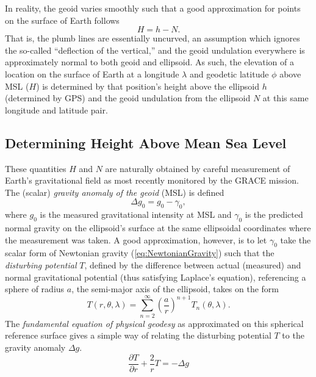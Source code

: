 \documentclass[11pt,dvipsnames]{thesis}
\begin{document}
In reality, the geoid varies smoothly such that a good approximation for points on the surface of Earth follows
\begin{equation}
H = h - N. \label{eq:ElevationAboveMSL}
\end{equation}
That is, the plumb lines are essentially uncurved, an assumption which ignores the so-called ``deflection of the vertical,'' and the geoid undulation everywhere is approximately normal to both geoid and ellipsoid. As such, the elevation of a location on the surface of Earth at a longitude $\lambda$ and geodetic latitude $\phi$ above MSL ($H$) is determined by that position's height above the ellipsoid $h$ (determined by GPS) and the geoid undulation from the ellipsoid $N$ at this same longitude and latitude pair.

\subsection{Determining Height Above Mean Sea Level}
These quantities $H$ and $N$ are naturally obtained by careful measurement of Earth's gravitational field as most recently monitored by the GRACE mission. The (scalar) \textit{gravity anomaly of the geoid} (MSL) is defined
\begin{equation}
\Delta g_0 = g_0 - \gamma_0,
\end{equation}
where $g_0$ is the measured gravitational intensity at MSL and $\gamma_0$ is the predicted normal gravity on the ellipsoid's surface at the same ellipsoidal coordinates where the measurement was taken. A good approximation, however, is to let $\gamma_0$ take the scalar form of Newtonian gravity (\ref{eq:NewtonianGravity}) such that the \textit{disturbing potential} $T$, defined by the difference between actual (measured) and normal gravitational potential (thus satisfying Laplace's equation), referencing a sphere of radius $a$, the semi-major axis of the ellipsoid, takes on the form
\begin{equation}
T(r, \theta, \lambda) = \sum_{n = 2}^\infty \left(\frac{a}{r}\right)^{\!n + 1} T_n(\theta, \lambda).
\end{equation}
The \textit{fundamental equation of physical geodesy} as approximated on this spherical reference surface gives a simple way of relating the disturbing potential $T$ to the gravity anomaly $\Delta g$.
\begin{equation}
\frac{\partial T}{\partial r} + \frac{2}{r} T = -\Delta g
\end{equation}
\end{document}
